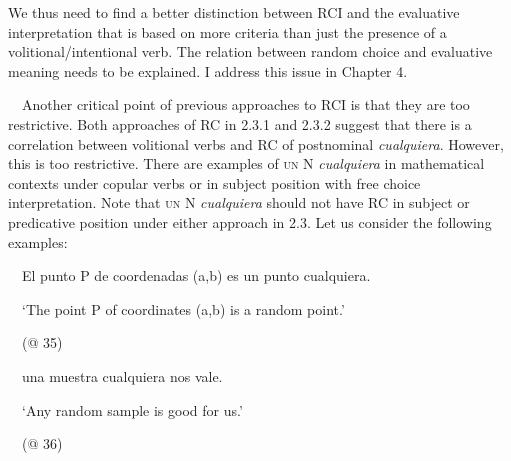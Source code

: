 \begin{styleStandard}
We thus need to find a better distinction between RCI and the evaluative interpretation that is based on more criteria than just the presence of a volitional/intentional verb. The relation between random choice and evaluative meaning needs to be explained. I address this issue in Chapter 4. 
\end{styleStandard}

\begin{styleStandard}
\ \ Another critical point of previous approaches to RCI is that they are too restrictive. Both approaches of RC in 2.3.1 and 2.3.2 suggest that there is a correlation between volitional verbs and RC of postnominal \textit{cualquiera}. However, this is too restrictive. There are examples of \textsc{un} N \textit{cualquiera} in mathematical contexts under copular verbs or in subject position with free choice interpretation. Note that \textsc{un} N \textit{cualquiera} should not have RC in subject or predicative position under either approach in 2.3. Let us consider the following examples:
\end{styleStandard}

\begin{styleStandard}
\label{bkm:Ref43031271}\ \ El punto P de coordenadas (a,b) es un punto cualquiera.
\end{styleStandard}

\begin{styleStandard}
\ \ ‘The point P of coordinates (a,b) is a random point.’
\end{styleStandard}

\begin{styleStandard}
\ \ (@ 35)
\end{styleStandard}

\begin{styleStandard}
\label{bkm:Ref43031168}\ \ una muestra cualquiera nos vale.
\end{styleStandard}

\begin{styleStandard}
\ \ ‘Any random sample is good for us.’ 
\end{styleStandard}

\begin{styleStandard}
\ \ (@ 36)
\end{styleStandard}

